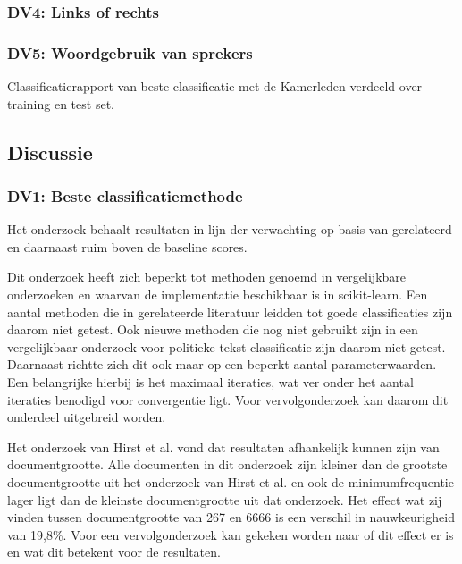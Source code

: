 \subsubsection{DV4: Links of rechts}

\subsubsection{DV5: Woordgebruik van sprekers}
\begin{table}[H]
\caption{Classificatierapport van beste classificatie met de Kamerleden verdeeld over training en test set.}
\label{tab:rapporttaalgebruik}
\centering

\end{table}

\subsection{Discussie}
\subsubsection{DV1: Beste classificatiemethode}
Het onderzoek behaalt resultaten in lijn der verwachting op basis van gerelateerd en daarnaast ruim boven de baseline scores.\par
Dit onderzoek heeft zich beperkt tot methoden genoemd in vergelijkbare onderzoeken en waarvan de implementatie beschikbaar is in scikit-learn. Een aantal methoden die in gerelateerde literatuur leidden tot goede classificaties zijn daarom niet getest. Ook nieuwe methoden die nog niet gebruikt zijn in een vergelijkbaar onderzoek voor politieke tekst classificatie zijn daarom niet getest. Daarnaast richtte zich dit ook maar op een beperkt aantal parameterwaarden. Een belangrijke hierbij is het maximaal iteraties, wat ver onder het aantal iteraties benodigd voor convergentie ligt. Voor vervolgonderzoek kan daarom dit onderdeel uitgebreid worden.\par
Het onderzoek van Hirst et al. vond dat resultaten afhankelijk kunnen zijn van documentgrootte. Alle documenten in dit onderzoek zijn kleiner dan de grootste documentgrootte uit het onderzoek van Hirst et al. en ook de minimumfrequentie lager ligt dan de kleinste documentgrootte uit dat onderzoek.
Het effect wat zij vinden tussen documentgrootte van 267 en 6666 is een verschil in nauwkeurigheid van 19,8\%. Voor een vervolgonderzoek kan gekeken worden naar of dit effect er is en wat dit betekent voor de resultaten.\par

